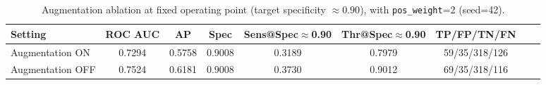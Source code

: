 \begin{table}[ht]
\centering
\caption{Augmentation ablation at fixed operating point (target specificity $\approx 0.90$), with \texttt{pos\_weight}=2 (seed=42).}
\label{tab:augmentation_ablation}
\begin{tabular}{lcccccccc}
\hline
Setting & ROC AUC & AP & Spec & Sens@Spec$\approx$0.90 & Thr@Spec$\approx$0.90 & TP/FP/TN/FN \\
\hline
Augmentation ON  & 0.7294 & 0.5758 & 0.9008 & 0.3189 & 0.7979 & 59/35/318/126 \\
Augmentation OFF & 0.7524 & 0.6181 & 0.9008 & 0.3730 & 0.9012 & 69/35/318/116 \\
\hline
\end{tabular}
\end{table}

